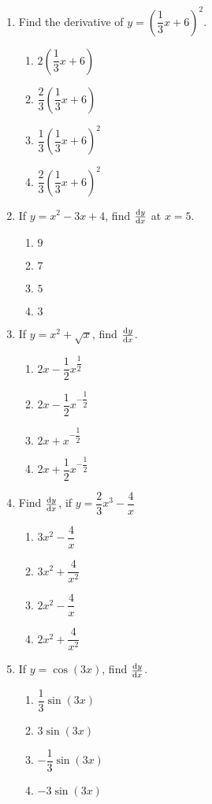 \begin{multicols}{2}
\begin{enumerate}[label={\arabic*.}]
\item Find the derivative of \(y ={\left(\dfrac{1}{3}x + 6\right)}^{2}\).
	\begin{enumerate}[label={\Alph*.}]
	\item \(2{\left(\dfrac{1}{3}x + 6\right)}\)
	\item \(\dfrac{2}{3}{\left(\dfrac{1}{3}x + 6\right)}\)
	\item \(\dfrac{1}{3}{\left(\dfrac{1}{3}x + 6\right)}^{2}\)
	\item \(\dfrac{2}{3}{\left(\dfrac{1}{3}x + 6\right)}^{2}\)
	\end{enumerate}
\item If \(y = {x}^{2}-3{x}+4\), find \(\dv{y}{x}\) at \(x = 5\).
	\begin{enumerate}[label={\Alph*.}]
	\item \(9\)
	\item \(7\)
	\item \(5\)
	\item \(3\)
	\end{enumerate}
\item If  \(y = {x}^{2}+\sqrt{x}\), find \(\dv{y}{x}\).
	\begin{enumerate}[label={\Alph*.}]
	\item \(2x-\dfrac{1}{2}x^{\dfrac{1}{2}}\)
	\item \(2x-\dfrac{1}{2}x^{-{\dfrac{1}{2}}}\)
	\item \(2x+x^{-{\dfrac{1}{2}}}\)
	\item \(2x+\dfrac{1}{2}x^{-{\dfrac{1}{2}}}\)
	\end{enumerate}
\item Find \(\dv{y}{x}\), if \(y = \dfrac{2}{3}{x}^{3}-\dfrac{4}{x}\)
	\begin{enumerate}[label={\Alph*.}]
	\item \({3}{x}^{2}-\dfrac{4}{x}\)
	\item \({3}{x}^{2}+\dfrac{4}{x^{2}}\)
	\item \({2}{x}^{2}-\dfrac{4}{x}\)
	\item \({2}{x}^{2}+\dfrac{4}{x^{2}}\)
	\end{enumerate}
\item If \(y = \cos{(3x)}\), find \(\dv{y}{x}\).
	\begin{enumerate}[label={\Alph*.}]
	\item \(\dfrac{1}{3}\sin{(3x)}\)
	\item \({3}\sin{(3x)}\)
	\item \(-{\dfrac{1}{3}}\sin{(3x)}\)
	\item \(-3\sin{(3x)}\)

\end{enumerate}
\end{enumerate}
\end{multicols}
